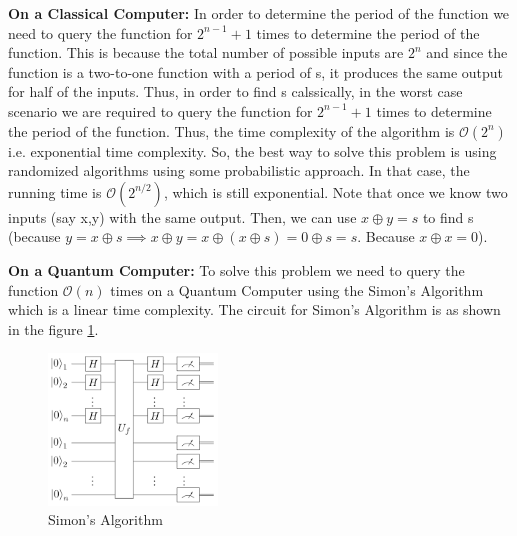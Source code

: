 \documentclass[12pt, oneside]{book}
\theoremstyle{definition}
\theoremstyle{definition}
\theoremstyle{remark}
\begin{document}
\textbf{On a Classical Computer: }In order to determine the period of the function we need to query the function for $2^{n-1}+1$ times to determine the period of the function.
This is because the total number of possible inputs are $2^n$ and since the function is a two-to-one function with a period of s, it produces the same output for half of the inputs.
Thus, in order to find s calssically, in the worst case scenario we are required to query the function for $2^{n-1}+1$ times to determine the period of the function.
Thus, the time complexity of the algorithm is $\mathcal{O}(2^n)$ i.e. exponential time complexity. So, the best way to solve this problem is using randomized algorithms using some probabilistic approach. In that case, 
the running time is $\mathcal{O}(2^{n/2})$, which is still exponential. Note that once we know two inputs (say x,y) with the same output. Then, we can use $x \oplus y=s$ to find s (because $y=x\oplus s\implies x \oplus y=x\oplus (x \oplus s) = 0\oplus s=s$. Because $x \oplus x=0$).

\textbf{On a Quantum Computer: }To solve this problem we need to query the function $\mathcal{O}(n)$ times on a Quantum Computer using the Simon's Algorithm which is a linear time complexity.
The circuit for Simon's Algorithm is as shown in the figure \ref{fig:simon}.
\begin{figure}[H]
    \centering
    \includegraphics[width=0.4\textwidth]{../images/Simon.png}
    \caption{Simon's Algorithm}
    \label{fig:simon}
\end{figure}
\end{document}
